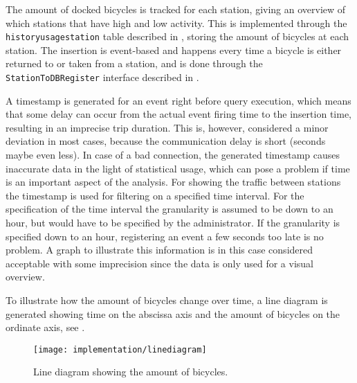 The amount of docked bicycles is tracked for each station, giving an overview of which stations that have high and low activity.
This is implemented through the \texttt{historyusagestation} table described in , storing the amount of bicycles at each station.
The insertion is event-based and happens every time a bicycle is either returned to or taken from a station, and is done through the \texttt{StationToDBRegister} interface described in .

A timestamp is generated for an event right before query execution, which means that some delay can occur from the actual event firing time to the insertion time, resulting in an imprecise trip duration. 
This is, however, considered a minor deviation in most cases, because the communication delay is short (seconds maybe even less).
In case of a bad connection, the generated timestamp causes inaccurate data in the light of statistical usage, which can pose a problem if time is an important aspect of the analysis.
For showing the traffic between stations the timestamp is used for filtering on a specified time interval.
For the specification of the time interval the granularity is assumed to be down to an hour, but would have to be specified by the administrator.
If the granularity is specified down to an hour, registering an event a few seconds too late is no problem.
A graph to illustrate this information is in this case considered acceptable with some imprecision since the data is only used for a visual overview.

To illustrate how the amount of bicycles change over time, a line diagram is generated showing time on the abscissa axis and the amount of bicycles on the ordinate axis, see .

\begin{figure}[h]
\centering
\texttt{[image: implementation/linediagram]}
\caption{Line diagram showing the amount of bicycles.}\label{fig:linediagram}
\end{figure}

